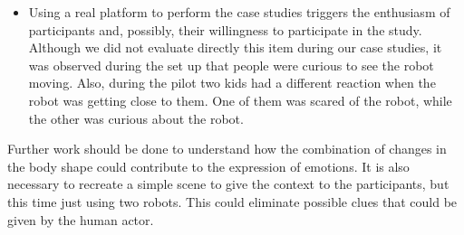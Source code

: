 \begin{itemize}
	\item Using a real platform to perform the case studies triggers the enthusiasm of participants and, possibly, their willingness to participate in the study. Although we did not evaluate directly this item during our case studies, it was observed during the set up that people were curious to see the robot moving. Also, during the pilot two kids had a different reaction when the robot was getting close to them. One of them was scared of the robot, while the other was curious about the robot.

\end{itemize}

Further work should be done to understand how the combination of changes in the body shape could contribute to the expression of emotions. It is also necessary to recreate a simple scene to give the context to the participants, but this time just using two robots. This could eliminate possible clues that could be given by the human actor.
